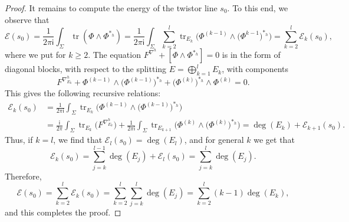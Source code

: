 \documentclass[10pt,a4paper]{amsart}
\renewcommand{\i}{\mathsf{i}}
\begin{document}
\begin{proof}
It remains to compute the energy of the twistor line $s_0$. To this end, we observe that
\[
\mathcal{E}(s_0) = \frac{1}{2\pi \i}\int_\Sigma \operatorname{tr}(\Phi\wedge \Phi^{*_h}) =
 \frac{1}{2\pi \i}\int_\Sigma\sum_{k=2}^l \operatorname{tr}_{E_k}\bigl(\Phi^{(k-1)}\wedge \bigl(\Phi^{k-1}\bigr)^{*_h}\bigr)
 = \sum_{k=2}^l\mathcal E_k(s_0),
\]
where we put \smash{$\mathcal E_k(s_0) =
\frac{1}{2\pi \i}\int_\Sigma \operatorname{tr}_{E_k}\bigl(\Phi^{(k-1)}\wedge \bigl(\Phi^{k-1}\bigr)^{*_h}\bigr)$}
for $k \geq 2$.
The equation $F^{\nabla^h} + {[\Phi\wedge\Phi^{*_h}] = 0}$ is in the form of diagonal blocks, with respect
to the splitting $E = \bigoplus_{k=1}^lE_k$, with components
\[
F^{\nabla^h_{E_k}} + \Phi^{(k-1)}\wedge \bigl(\Phi^{(k-1)}\bigr)^{*_h} + \bigl(\Phi^{(k)}\bigr)^{*_h}\wedge \Phi^{(k)} = 0.
\]
This gives the following recursive relations:
\begin{align*}
\mathcal E_k(s_0) & = \frac{1}{2\pi \i}\int_\Sigma\operatorname{tr}_{E_k}\bigl(\Phi^{(k-1)}\wedge \bigl(\Phi^{(k-1)}\bigr)^{*_h}\bigr)\\
&= \frac{\i}{2\pi}\int_\Sigma\operatorname{tr}_{E_k}\bigl(F^{\nabla^h_{E_k}}\bigr) +\frac{1}{2\pi \i}\int_\Sigma\operatorname{tr}_{E_{k+1}}\bigl(\Phi^{(k)}\wedge\bigl(\Phi^{(k)}\bigr)^{*_h}\bigr)= \deg(E_k) + \mathcal E_{k+1}(s_0).
\end{align*}
Thus, if $k = l$, we find that
$
\mathcal E_l(s_0) = \deg(E_l) $,
and for general $k$ we get that
\[
\mathcal E_k(s_0) = \sum_{j=k}^{l-1}\deg(E_j) + \mathcal E_l(s_0) = \sum_{j=k}^l\deg(E_j).
\]
Therefore,
\[
\mathcal E(s_0) = \sum_{k=2}^l\mathcal E_k(s_0) = \sum_{k=2}^l\sum_{j=k}^l\deg(E_j)
 = \sum_{k=2}^l(k-1)\deg(E_k),
\]
and this completes the proof.
\end{proof}
\end{document}
